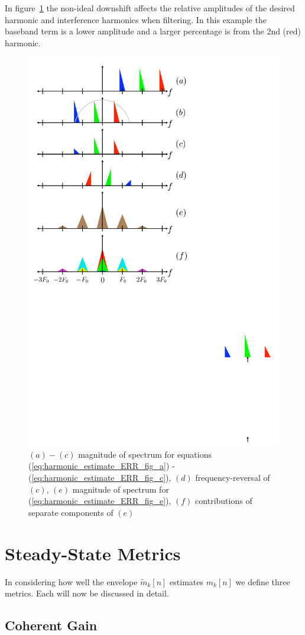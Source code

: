 \documentclass [11pt, proquest,oneside] {ganter_thesis}[2015/03/03]
\begin{document}
In figure~\ref{fig:downshift_effects} the non-ideal downshift affects the relative amplitudes of the desired harmonic and interference harmonics when filtering.  In this example the baseband term is a lower amplitude and a larger percentage is from the 2nd (red) harmonic.

\begin{figure}[!ht]
  \centering
    \includegraphics[width=.62\textwidth]{downshift_effects} 
    \caption{$(a)-(c)$ magnitude of spectrum for equations (\ref{eq:harmonic_estimate_ERR_fig_a}) - (\ref{eq:harmonic_estimate_ERR_fig_c}), $(d)$ frequency-reversal of $(c)$, $(e)$ magnitude of spectrum for (\ref{eq:harmonic_estimate_ERR_fig_e}), $(f)$ contributions of separate components of $(e)$}\label{fig:downshift_effects}
\end{figure}

\clearpage

\section{Steady-State Metrics}

In considering how well the envelope $\tilde{m}_k[n]$ estimates $m_k[n]$ we define three metrics.  Each will now be discussed in detail.

\subsection{Coherent Gain}
\end{document}
